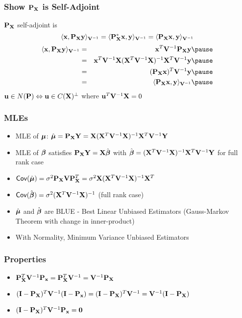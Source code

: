 \documentclass[]{beamer}
\begin{document}
\begin{frame}
  \frametitle{Show $\P_\X$ is Self-Adjoint}
 $\P_\X$ self-adjoint is
$$\langle \x, \P_\X \y \rangle_{\V^{-1}} = \langle \P_\X^*\x, \y
 \rangle_{\V^{-1}} =  \langle \P_\X\x, \y
 \rangle_{\V^{-1}}$$
\pause
 \begin{eqnarray*}
   \langle \x, \P_\X \y \rangle_{\V^{-1}} & = & \x^T \V^{-1} \P_\X
   \y  \pause\\ 
 & = & \x^T \V^{-1} \X (\X^T\V^{-1} \X)^{-1} \X^T \V^{-1}  \y  \pause\\ 
 & = &  (\P_\X \x)^T \V^{-1} \y  \pause\\
 & = &  \langle \P_\X\x, \y  \rangle_{\V^{-1}} \pause
 \end{eqnarray*}
$\u \in N(\P) \Leftrightarrow \u \in C(\X)^\perp$ where $\u^T \V^{-1}
\X =0$
\end{frame}
\begin{frame}
  \frametitle{MLEs}
  \begin{itemize}
  \item MLE of $\mub$: $\muhat = \P_\X \Y = \X (\X^T\V^{-1} \X)^{-1} \X^T \V^{-1}
    \Y$ \pause
\item MLE of $\b$ satisfies $\P_\X \Y = \X \bhat$ with 
$\bhat = (\X^T\V^{-1} \X)^{-1} \X^T \V^{-1} 
    \Y$ for full rank case \pause
\item $\Cov(\muhat) = \sigma^2 \P_\X \V \P_\X^T = \sigma^2 \X (\X^T
  \V^{-1} \X)^{-1} \X^T$ \pause
\item $\Cov(\bhat) = \sigma^2 (\X^T\V^{-1} \X)^{-1}$  (full rank case) \pause
\item $\muhat$ and $\bhat$ are BLUE - Best Linear Unbiased Estimators
  (Gauss-Markov Theorem with change in inner-product) \pause
\item With Normality, Minimum Variance Unbiased Estimators 
  \end{itemize}
\end{frame}
\begin{frame}
  \frametitle{Properties}
  \vspace{-24pt}
  \begin{itemize}
  \item $\P_\X^T \V^{-1} \P_\x = \P_\X^T \V^{-1} = \V^{-1} \P_\X$
    \pause

 \item $(\I- \P_\X)^T \V^{-1}(\I - \P_\x) = (\I - \P_\X)^T \V^{-1} =
   \V^{-1}(\I - \P_\X)$ \pause
\item  $(\I- \P_\X)^T \V^{-1}\P_\x = \zero$

  \end{itemize}
\vfill
\end{frame}
\end{document}
